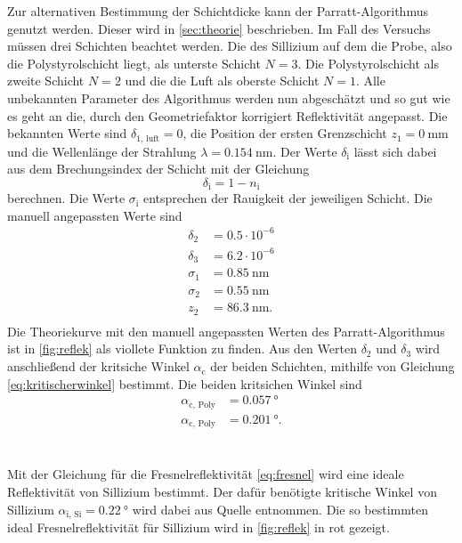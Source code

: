 Zur alternativen Bestimmung der Schichtdicke kann der Parratt-Algorithmus genutzt werden.
Dieser wird in \autoref{sec:theorie} beschrieben.
Im Fall des Versuchs müssen drei Schichten beachtet werden.
Die des Sillizium auf dem die Probe, also die Polystyrolschicht liegt, als unterste Schicht $N=3$.
Die Polystyrolschicht als zweite Schicht $N=2$ und die die Luft als oberste Schicht $N=1$.
Alle unbekannten Parameter des Algorithmus werden nun abgeschätzt und so gut wie es geht an die, durch den Geometriefaktor korrigiert Reflektivität angepasst.
Die bekannten Werte sind $\delta_\text{1, luft} = 0$, die Position der ersten Grenzschicht $z_1= \SI{0}{\milli\meter}$ und die Wellenlänge der Strahlung $\lambda =\SI{0.154}{\nano\meter}$.
Der Werte $\delta_\text{i}$ lässt sich dabei aus dem Brechungsindex der Schicht mit der Gleichung
\begin{equation}
    \delta_\text{i} = 1- n_\text{i}
\end{equation}
berechnen.
Die Werte $\sigma_\text{i}$ entsprechen der Rauigkeit der jeweiligen Schicht.
Die manuell angepassten Werte sind
\begin{align*}
    \delta_2 &= 0.5\cdot10^{-6}        \\ 
    \delta_3 &= 6.2\cdot10^{-6}        \\ 
    \sigma_1 &= \SI{0.85}{\nano\meter} \\ 
    \sigma_2 &= \SI{0.55}{\nano\meter} \\ 
    z_2 &= \SI{86.3}{\nano\meter}.  \\
\end{align*}
Die Theoriekurve mit den manuell angepassten Werten des Parratt-Algorithmus ist in \autoref{fig:reflek} als viollete Funktion zu finden.
Aus den Werten $\delta_2$ und $\delta_3$ wird anschließend der kritsiche Winkel $\alpha_\text{c}$ der beiden Schichten, mithilfe von Gleichung \eqref{eq:kritischerwinkel} bestimmt.
Die beiden kritsichen Winkel sind 
\begin{align*}
    \alpha_\text{c, Poly} &= \SI{0.057}{\degree}\\
    \alpha_\text{c, Poly} &= \SI{0.201}{\degree}.
\end{align*}
\\\\
Mit der Gleichung für die Fresnelreflektivität \eqref{eq:fresnel} wird eine ideale Reflektivität von Sillizium bestimmt.
Der dafür benötigte kritische Winkel von Sillizium $\alpha_\text{i, Si} = \SI{0.22}{\degree}$ wird dabei aus Quelle \cite[8]{alte_anleitung} entnommen.
Die so bestimmten ideal Fresnelreflektivität für Sillizium wird in \autoref{fig:reflek} in rot gezeigt.
